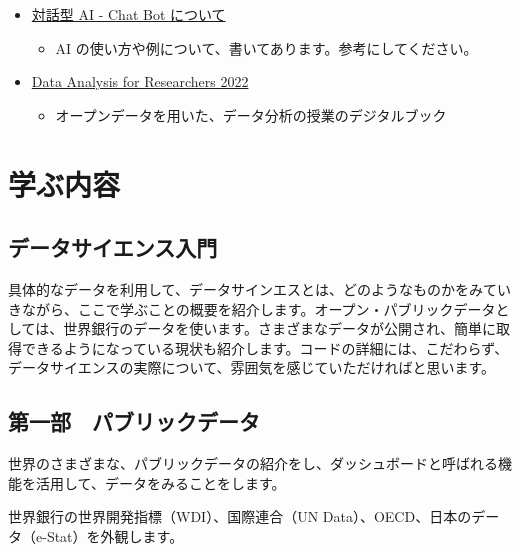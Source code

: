 \documentclass[
  xelatex, ja=standard]{bxjsbook}
\providecommand{\tightlist}{%
  \setlength{\itemsep}{0pt}\setlength{\parskip}{0pt}}
\theoremstyle{definition}
\theoremstyle{definition}
\theoremstyle{definition}
\theoremstyle{definition}
\theoremstyle{remark}
\begin{document}
\begin{itemize}
\tightlist
\item
  \href{https://icu-hsuzuki.github.io/ds_education/chatgpt.html\#chatgpt}{対話型 AI - Chat Bot について}

  \begin{itemize}
  \tightlist
  \item
    AI の使い方や例について、書いてあります。参考にしてください。
  \end{itemize}
\item
  \href{https://icu-hsuzuki.github.io/da4r2022/}{Data Analysis for Researchers 2022}

  \begin{itemize}
  \tightlist
  \item
    オープンデータを用いた、データ分析の授業のデジタルブック
  \end{itemize}
\end{itemize}

\hypertarget{what2learn}{%
\chapter{学ぶ内容　}\label{what2learn}}

\hypertarget{ux30c7ux30fcux30bfux30b5ux30a4ux30a8ux30f3ux30b9ux5165ux9580}{%
\section{データサイエンス入門}\label{ux30c7ux30fcux30bfux30b5ux30a4ux30a8ux30f3ux30b9ux5165ux9580}}

具体的なデータを利用して、データサインエスとは、どのようなものかをみていきながら、ここで学ぶことの概要を紹介します。オープン・パブリックデータとしては、世界銀行のデータを使います。さまざまなデータが公開され、簡単に取得できるようになっている現状も紹介します。コードの詳細には、こだわらず、データサイエンスの実際について、雰囲気を感じていただければと思います。

\hypertarget{ux7b2cux4e00ux90e8-ux30d1ux30d6ux30eaux30c3ux30afux30c7ux30fcux30bf}{%
\section{第一部　パブリックデータ}\label{ux7b2cux4e00ux90e8-ux30d1ux30d6ux30eaux30c3ux30afux30c7ux30fcux30bf}}

世界のさまざまな、パブリックデータの紹介をし、ダッシュボードと呼ばれる機能を活用して、データをみることをします。

世界銀行の世界開発指標（WDI）、国際連合（UN Data）、OECD、日本のデータ（e-Stat）を外観します。
\end{document}
